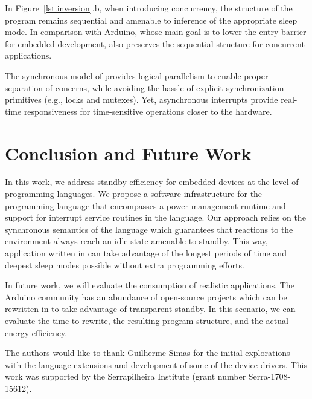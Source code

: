 In Figure~\ref{lst.inversion}.b, when introducing concurrency, the structure of
the program remains sequential and amenable to inference of the appropriate
sleep mode.
In comparison with Arduino, whose main goal is to lower the entry barrier for
embedded development, \CEU also preserves the sequential structure for
concurrent applications.

The synchronous model of \CEU provides logical parallelism to enable proper
separation of concerns, while avoiding the hassle of explicit synchronization
primitives (e.g., locks and mutexes).
%
Yet, asynchronous interrupts provide real-time responsiveness for
time-sensitive operations closer to the hardware.

\section{Conclusion and Future Work}
\label{sec.conclusion}

In this work, we address standby efficiency for embedded devices at the level
of programming languages.
%
We propose a software infrastructure for the programming language \CEU that
encompasses a power management runtime and support for interrupt service
routines in the language.
%
Our approach relies on the synchronous semantics of the language which
guarantees that reactions to the environment always reach an idle state
amenable to standby.
%
This way, application written in \CEU can take advantage of the longest periods
of time and deepest sleep modes possible without extra programming efforts.

In future work, we will evaluate the consumption of realistic applications.
%
The Arduino community has an abundance of open-source projects which can be
rewritten in \CEU to take advantage of transparent standby.
%
In this scenario, we can evaluate the time to rewrite, the resulting program
structure, and the actual energy efficiency.

\begin{acks}
The authors would like to thank Guilherme Simas for the initial explorations
with the language extensions and development of some of the device drivers.
This work was supported by the Serrapilheira Institute (grant number
Serra-1708-15612).
\end{acks}

\balance
